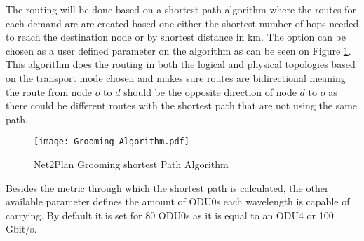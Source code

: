 	The routing will be done based on a shortest path algorithm where the routes for each demand are are created based one either the shortest number of hops needed to reach the destination node or by shortest distance in km. The option can be chosen as a user defined parameter on the algorithm as can be seen on Figure \ref{Grooming_Algorithm}. This algorithm does the routing in both the logical and physical topologies based on the transport mode chosen and makes sure routes are bidirectional meaning the route from node $o$ to $d$ should be the opposite direction of node $d$ to $o$ as there could be different routes with the shortest path that are not using the same path.
	
	\vspace{0.5cm}
	\begin{figure}[h!]
		\centering
		\texttt{[image: Grooming\_Algorithm.pdf]}
		\caption{Net2Plan Grooming shortest Path Algorithm}
		\label{Grooming_Algorithm}
	\end{figure}	
	
	Besides the metric through which the shortest path is calculated, the other available parameter defines the amount of ODU0s each wavelength is capable of carrying. By default it is set for 80 ODU0s as it is equal to an ODU4 or 100 Gbit/s.\\

	
		
	
